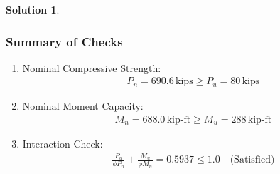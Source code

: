 \documentclass[12pt]{article}
\theoremstyle{definition} %
\newtheorem{solution}{Solution}
\theoremstyle{plain} %
\begin{document}
\begin{solution}
\begin{enumerate}
\subsubsection*{Summary of Checks}
\begin{enumerate}
    \item Nominal Compressive Strength:
    \begin{align}
    P_n = 690.6 \, \text{kips} \geq P_u = 80 \, \text{kips}
    \end{align}
    
    \item Nominal Moment Capacity:
    \begin{align}
    M_n = 688.0 \, \text{kip-ft} \geq M_u = 288 \, \text{kip-ft}
    \end{align}
    
    \item Interaction Check:
    \begin{align}
    \frac{P_u}{\phi P_n} + \frac{M_u}{\phi M_n} = 0.5937 \leq 1.0 \quad \text{(Satisfied)}
    \end{align}
\end{enumerate}



\end{enumerate}

\end{solution}
\end{document}
